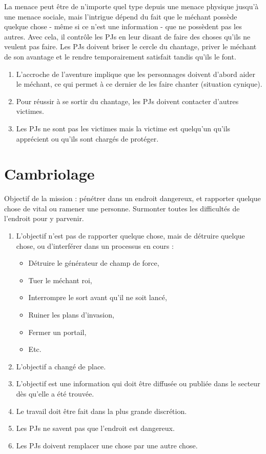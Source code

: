 \begin{multicols}{2}
La menace peut être de n'importe quel type depuis une menace physique jusqu'à une menace sociale, mais l'intrigue dépend du fait que le méchant possède quelque chose - même si ce n'est une information - que ne possèdent pas les autres. Avec cela, il contrôle les PJs en leur disant de faire des choses qu'ils ne veulent pas faire. Les PJs doivent briser le cercle du chantage, priver le méchant de son avantage et le rendre temporairement satisfait tandis qu'ils le font.

\themes
\begin{enumerate}
\item L'accroche de l'aventure implique que les personnages doivent d'abord aider le méchant, ce qui permet à ce dernier de les faire chanter (situation cynique).
\item Pour réussir à se sortir du chantage, les PJs doivent contacter d'autres victimes.
\item Les PJs ne sont pas les victimes mais la victime est quelqu'un qu'ils apprécient ou qu'ils sont chargés de protéger.
\end{enumerate}

\section{Cambriolage}
\label{cambriolage}


Objectif de la mission : pénétrer dans un endroit dangereux, et rapporter quelque chose de vital ou ramener une personne. Surmonter toutes les difficultés de l'endroit pour y parvenir.

\themes
\begin{enumerate}
\item L'objectif n'est pas de rapporter quelque chose, mais de détruire quelque chose, ou d'interférer dans un processus en cours :
\begin{itemize}
\item Détruire le générateur de champ de force,
\item Tuer le méchant roi,
\item Interrompre le sort avant qu'il ne soit lancé,
\item Ruiner les plans d'invasion,
\item Fermer un portail,
\item Etc.
\end{itemize}
\item L'objectif a changé de place.
\item L'objectif est une information qui doit être diffusée ou publiée dans le secteur dès qu'elle a été trouvée.
\item Le travail doit être fait dans la plus grande discrétion.
\item Les PJs ne savent pas que l'endroit est dangereux.
\item Les PJs doivent remplacer une chose par une autre chose.
\end{enumerate}


\end{multicols}
